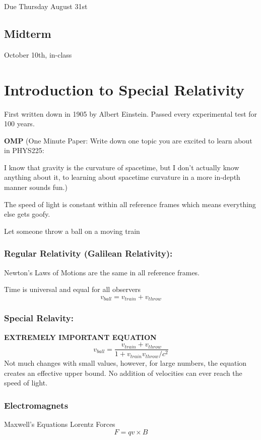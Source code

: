 \documentclass{report}
\begin{document}
Due Thursday August 31st

\section{Midterm}

October 10th, in-class


\chapter{Introduction to Special Relativity}
First written down in 1905 by Albert Einstein. Passed every experimental test for 100 years.

\textbf{OMP}
(One Minute Paper: Write down one topic you are excited to learn about in PHYS225:

I know that gravity is the curvature of spacetime, but I don't actually know anything about it, to learning about spacetime curvature in a more in-depth manner sounds fun.)
\newline

The speed of light is constant within all reference frames which means everything else gets goofy.

Let someone throw a ball on a moving train

\subsection*{Regular Relativity (Galilean Relativity):}

Newton's Laws of Motions are the same in all reference frames.

Time is universal and equal for all observers
\[
v_{ball} = v_{train} + v_{throw}
\]

\subsection{Special Relavity:}
\textbf{EXTREMELY IMPORTANT EQUATION}
\[
v_{ball} = 
\frac
{v_{train} + v_{throw}}
{1+v_{train}v_{throw}/c^2}
\]
Not much changes with small values, however, for large numbers, the equation creates an effective upper bound. No addition of velocities can ever reach the speed of light.

\subsection*{Electromagnets}
Maxwell's Equations 
Lorentz Forces
\[
F = qv \times B
\]
\end{document}
